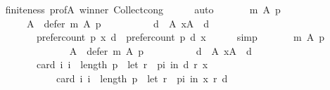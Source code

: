 \begin{isabellebody}
\ \ \ \ \isamarkupfalse%
\ finiteness\ prof{\isacharunderscore}{\kern0pt}A\ winner\ Collect{\isacharunderscore}{\kern0pt}cong\isanewline
\ \ \ \ \isamarkupfalse%
\ auto\isanewline
\ \ \isamarkupfalse%
\isanewline
\ \ \ \ {\isachardoublequoteopen}m\ A\ p\ {\isacharequal}{\kern0pt}\isanewline
\ \ \ \ \ \ \ \ {\isacharparenleft}{\kern0pt}{\isacharbraceleft}{\kern0pt}{\isacharbraceright}{\kern0pt}{\isacharcomma}{\kern0pt}\isanewline
\ \ \ \ \ \ \ \ \ \ A\ {\isacharminus}{\kern0pt}\ defer\ m\ A\ p{\isacharcomma}{\kern0pt}\isanewline
\ \ \ \ \ \ \ \ \ \ {\isacharbraceleft}{\kern0pt}d\ {\isasymin}\ A{\isachardot}{\kern0pt}\ {\isasymforall}x{\isasymin}A\ {\isacharminus}{\kern0pt}\ {\isacharbraceleft}{\kern0pt}d{\isacharbraceright}{\kern0pt}{\isachardot}{\kern0pt}\isanewline
\ \ \ \ \ \ \ \ \ \ \ \ prefer{\isacharunderscore}{\kern0pt}count\ p\ x\ d\ {\isacharless}{\kern0pt}\ prefer{\isacharunderscore}{\kern0pt}count\ p\ d\ x{\isacharbraceright}{\kern0pt}{\isacharparenright}{\kern0pt}{\isachardoublequoteclose}\isanewline
\ \ \ \ \isamarkupfalse%
\ simp\isanewline
\ \ \isamarkupfalse%
\isanewline
\ \ \ \ {\isachardoublequoteopen}m\ A\ p\ {\isacharequal}{\kern0pt}\isanewline
\ \ \ \ \ \ \ \ {\isacharparenleft}{\kern0pt}{\isacharbraceleft}{\kern0pt}{\isacharbraceright}{\kern0pt}{\isacharcomma}{\kern0pt}\isanewline
\ \ \ \ \ \ \ \ \ \ A\ {\isacharminus}{\kern0pt}\ defer\ m\ A\ p{\isacharcomma}{\kern0pt}\isanewline
\ \ \ \ \ \ \ \ \ \ {\isacharbraceleft}{\kern0pt}d\ {\isasymin}\ A{\isachardot}{\kern0pt}\ {\isasymforall}x{\isasymin}A\ {\isacharminus}{\kern0pt}\ {\isacharbraceleft}{\kern0pt}d{\isacharbraceright}{\kern0pt}{\isachardot}{\kern0pt}\isanewline
\ \ \ \ \ \ \ \ \ \ \ \ card\ {\isacharbraceleft}{\kern0pt}i{\isachardot}{\kern0pt}\ i\ {\isacharless}{\kern0pt}\ length\ p\ {\isasymand}\ {\isacharparenleft}{\kern0pt}let\ r\ {\isacharequal}{\kern0pt}\ {\isacharparenleft}{\kern0pt}p{\isacharbang}{\kern0pt}i{\isacharparenright}{\kern0pt}\ in\ {\isacharparenleft}{\kern0pt}d\ {\isasympreceq}\isactrlsub r\ x{\isacharparenright}{\kern0pt}{\isacharparenright}{\kern0pt}{\isacharbraceright}{\kern0pt}\ {\isacharless}{\kern0pt}\isanewline
\ \ \ \ \ \ \ \ \ \ \ \ \ \ \ \ card\ {\isacharbraceleft}{\kern0pt}i{\isachardot}{\kern0pt}\ i\ {\isacharless}{\kern0pt}\ length\ p\ {\isasymand}\ {\isacharparenleft}{\kern0pt}let\ r\ {\isacharequal}{\kern0pt}\ {\isacharparenleft}{\kern0pt}p{\isacharbang}{\kern0pt}i{\isacharparenright}{\kern0pt}\ in\ {\isacharparenleft}{\kern0pt}x\ {\isasympreceq}\isactrlsub r\ d{\isacharparenright}{\kern0pt}{\isacharparenright}{\kern0pt}{\isacharbraceright}{\kern0pt}{\isacharbraceright}{\kern0pt}{\isacharparenright}{\kern0pt}{\isachardoublequoteclose}\isanewline

\end{isabellebody}
